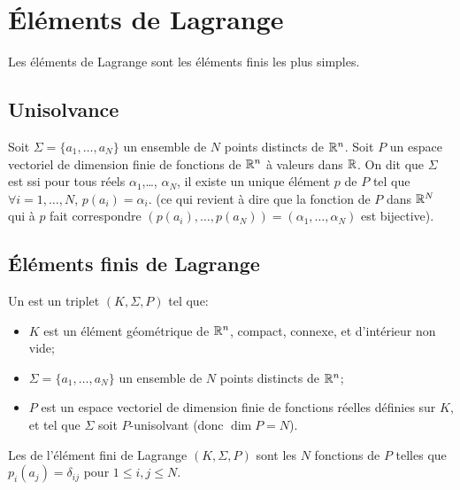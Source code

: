 \medskip
\section{Éléments de Lagrange}

Les éléments de Lagrange sont les éléments finis les plus simples.

\medskip
\subsection{Unisolvance}\label{Sec-unisolvance}

\begin{definition}[Unisolvance]
Soit $\Sigma=\{a_1,\ldots, a_N\}$ un ensemble de $N$ points distincts de $\mathbb R^n$.
Soit $P$ un espace vectoriel de dimension finie de fonctions de $\mathbb R^n$ à valeurs dans $\mathbb R$.
On dit que $\Sigma$ est  ssi pour tous réels $\alpha_1$,\ldots, $\alpha_N$,
il existe un unique élément $p$ de $P$ tel que $\forall i=1,\ldots, N$, $p(a_i) = \alpha_i$.
(ce qui revient à dire que la fonction de $P$ dans $\mathbb R^N$ qui à $p$ fait correspondre
$(p(a_i),\ldots, p(a_N))=(\alpha_1,\ldots, \alpha_N)$ est bijective).
\end{definition}

\medskip
\subsection{Éléments finis de Lagrange}

\begin{definition}
Un  est un triplet $(K, \Sigma, P)$ tel que:
\begin{itemize}
\item $K$ est un élément géométrique de $\mathbb R^n$, compact, connexe, et d'intérieur
	non vide;
\item $\Sigma=\{a_1,\ldots, a_N\}$ un ensemble de $N$ points distincts de $\mathbb R^n$;
\item $P$ est un espace vectoriel de dimension finie de fonctions réelles définies sur $K$, et tel
	que $\Sigma$ soit $P$-unisolvant (donc $\dim P = N$).
\end{itemize}
\end{definition}
\medskip
Les  de l'élément fini de Lagrange $(K, \Sigma, P)$
sont les $N$ fonctions de $P$ telles que $p_i(a_j)=\delta_{ij}$ pour $1\le i,j\le N$.
\medskip

